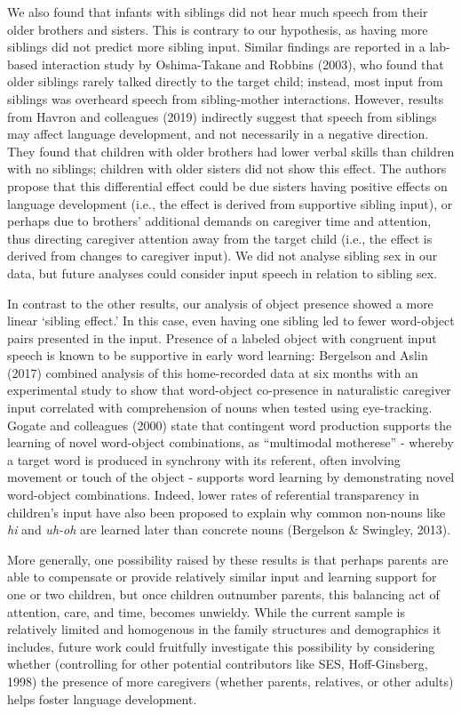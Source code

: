 \documentclass[
  english,
  man,floatsintext]{apa6}
\begin{document}
We also found that infants with siblings did not hear much speech from their older brothers and sisters. This is contrary to our hypothesis, as having more siblings did not predict more sibling input. Similar findings are reported in a lab-based interaction study by Oshima-Takane and Robbins (2003), who found that older siblings rarely talked directly to the target child; instead, most input from siblings was overheard speech from sibling-mother interactions. However, results from Havron and colleagues (2019) indirectly suggest that speech from siblings may affect language development, and not necessarily in a negative direction. They found that children with older brothers had lower verbal skills than children with no siblings; children with older sisters did not show this effect. The authors propose that this differential effect could be due sisters having positive effects on language development (i.e., the effect is derived from supportive sibling input), or perhaps due to brothers' additional demands on caregiver time and attention, thus directing caregiver attention away from the target child (i.e., the effect is derived from changes to caregiver input). We did not analyse sibling sex in our data, but future analyses could consider input speech in relation to sibling sex.

In contrast to the other results, our analysis of object presence showed a more linear `sibling effect.' In this case, even having one sibling led to fewer word-object pairs presented in the input. Presence of a labeled object with congruent input speech is known to be supportive in early word learning: Bergelson and Aslin (2017) combined analysis of this home-recorded data at six months with an experimental study to show that word-object co-presence in naturalistic caregiver input correlated with comprehension of nouns when tested using eye-tracking. Gogate and colleagues (2000) state that contingent word production supports the learning of novel word-object combinations, as ``multimodal motherese'' - whereby a target word is produced in synchrony with its referent, often involving movement or touch of the object - supports word learning by demonstrating novel word-object combinations. Indeed, lower rates of referential transparency in children's input have also been proposed to explain why common non-nouns like \emph{hi} and \emph{uh-oh} are learned later than concrete nouns (Bergelson \& Swingley, 2013).

More generally, one possibility raised by these results is that perhaps parents are able to compensate or provide relatively similar input and learning support for one or two children, but once children outnumber parents, this balancing act of attention, care, and time, becomes unwieldy. While the current sample is relatively limited and homogenous in the family structures and demographics it includes, future work could fruitfully investigate this possibility by considering whether (controlling for other potential contributors like SES, Hoff-Ginsberg, 1998) the presence of more caregivers (whether parents, relatives, or other adults) helps foster language development.
\end{document}
